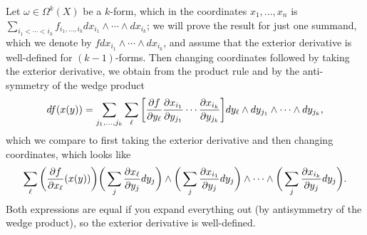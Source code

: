 \documentclass[11pt,leqno]{article}
\theoremstyle{plain}
\theoremstyle{definition}
\numberwithin{equation}{section}
\numberwithin{lem}{section}
\begin{document}
\begin{enumerate}
\begin{enumerate}
      Let $\omega\in \Omega^k(X)$ be a $k$-form, which in the coordinates $x_1,\dots,x_n$ is $\sum_{i_1<\cdots<i_k}f_{i_1,\dots,i_k}dx_{i_1}\wedge\cdots\wedge dx_{i_k}$; we will prove the result for just one summand, which we denote by $f dx_{i_1}\wedge\cdots\wedge dx_{i_k}$, and assume that the exterior derivative is well-defined for $(k-1)$-forms. Then changing coordinates followed by taking the exterior derivative, we obtain from the product rule and by the anti-symmetry of the wedge product
      \[df(x(y))=\sum_{j_1,\dots,j_k}\sum_\ell\bigg[\pdv{f}{y_\ell}\pdv{x_{i_1}}{y_{j_1}}\cdots \pdv{x_{i_k}}{y_{j_k}}\bigg]dy_\ell\wedge dy_{j_1}\wedge\cdots\wedge dy_{j_k},\] which we compare to first taking the exterior derivative and then changing coordinates, which looks like
      \[\sum_\ell\bigg(\pdv{f}{x_\ell}\/(x(y))\bigg)\bigg(\sum_j\pdv{x_\ell}{y_j}dy_j\bigg)\wedge\bigg(\sum_j\pdv{x_{i_1}}{y_j}dy_j\bigg)\wedge\cdots\wedge\bigg(\sum_j\pdv{x_{i_k}}{y_j}dy_j\bigg).\] Both expressions are equal if you expand everything out (by antisymmetry of the wedge product), so the exterior derivative is well-defined.
      

\end{enumerate}
\end{enumerate}
\end{document}
